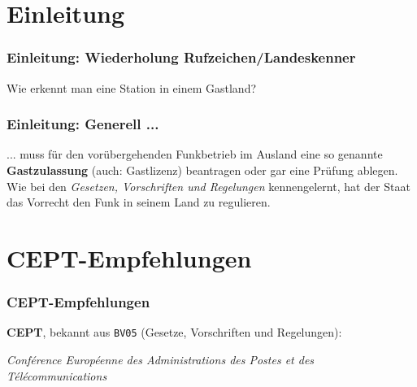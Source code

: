 

\subtitle{Betriebstechnik/Vorschriften 07: \\
          Funkbetrieb im Ausland \\[2em]}
\date{Stand 27.11.2014}



\section{Einleitung}

\begin{frame}
    \frametitle{Einleitung: Wiederholung Rufzeichen/Landeskenner}

    \begin{center}
        \Large{Wie erkennt man eine Station in einem Gastland?}
    \end{center}

\end{frame}

\begin{frame}
    \frametitle{Einleitung: Generell ...}

    ... muss für den vorübergehenden Funkbetrieb im Ausland eine so genannte
    \textbf{Gastzulassung} (auch: Gastlizenz) beantragen oder gar eine Prüfung
    ablegen. \\[1em]

    Wie bei den \emph{Gesetzen, Vorschriften und Regelungen} kennengelernt, hat
    der Staat das Vorrecht den Funk in seinem Land zu regulieren.

\end{frame}

\section{CEPT-Empfehlungen}

\begin{frame}
    \frametitle{CEPT-Empfehlungen}

    \textbf{CEPT}, bekannt aus \texttt{BV05} (Gesetze, Vorschriften und Regelungen): \\[1em]

    \begin{center}
        \emph{Conférence Européenne des Administrations des Postes et des
        Télécommunications}
    \end{center}

\end{frame}

